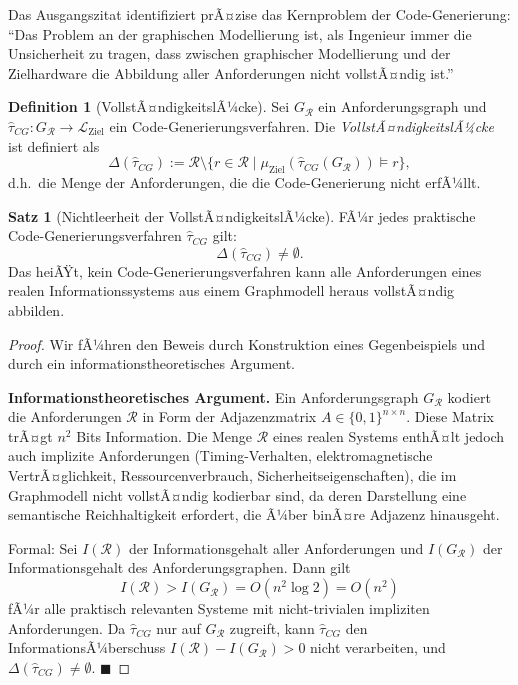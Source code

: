 ﻿\documentclass[a4paper,12pt]{article}
\theoremstyle{definition}
\newtheorem{definition}{Definition}
\newtheorem{satz}{Satz}
\begin{document}
Das Ausgangszitat identifiziert prÃ¤zise das Kernproblem der Code-Generierung:
\enquote{Das Problem an der graphischen Modellierung ist, als Ingenieur immer die Unsicherheit
zu tragen, dass zwischen graphischer Modellierung und der Zielhardware die Abbildung aller
Anforderungen nicht vollstÃ¤ndig ist.}

\begin{definition}[VollstÃ¤ndigkeitslÃ¼cke]
\label{def:vollstaendigkeit}
Sei $G_\mathcal{R}$ ein Anforderungsgraph und $\hat{\tau}_{CG}: G_\mathcal{R} \to \mathcal{L}_{\text{Ziel}}$
ein Code-Generierungsverfahren. Die \emph{VollstÃ¤ndigkeitslÃ¼cke} ist definiert als
\[
  \Delta(\hat{\tau}_{CG}) := \mathcal{R} \setminus \{r \in \mathcal{R} \mid
  \mu_{\text{Ziel}}(\hat{\tau}_{CG}(G_\mathcal{R})) \models r\},
\]
d.h.\ die Menge der Anforderungen, die die Code-Generierung nicht erfÃ¼llt.
\end{definition}

\begin{satz}[Nichtleerheit der VollstÃ¤ndigkeitslÃ¼cke]
\label{satz:luecke}
FÃ¼r jedes praktische Code-Generierungsverfahren $\hat{\tau}_{CG}$ gilt:
\[
  \Delta(\hat{\tau}_{CG}) \neq \emptyset.
\]
Das heiÃŸt, kein Code-Generierungsverfahren kann alle Anforderungen eines realen
Informationssystems aus einem Graphmodell heraus vollstÃ¤ndig abbilden.
\end{satz}

\begin{proof}
Wir fÃ¼hren den Beweis durch Konstruktion eines Gegenbeispiels und durch ein
informationstheoretisches Argument.

\textbf{Informationstheoretisches Argument.}
Ein Anforderungsgraph $G_\mathcal{R}$ kodiert die Anforderungen $\mathcal{R}$ in Form
der Adjazenzmatrix $A \in \{0,1\}^{n \times n}$. Diese Matrix trÃ¤gt $n^2$ Bits Information.
Die Menge $\mathcal{R}$ eines realen Systems enthÃ¤lt jedoch auch implizite Anforderungen
(Timing-Verhalten, elektromagnetische VertrÃ¤glichkeit, Ressourcenverbrauch, Sicherheitseigenschaften),
die im Graphmodell nicht vollstÃ¤ndig kodierbar sind, da deren Darstellung eine
semantische Reichhaltigkeit erfordert, die Ã¼ber binÃ¤re Adjazenz hinausgeht.

Formal: Sei $I(\mathcal{R})$ der Informationsgehalt aller Anforderungen und
$I(G_\mathcal{R})$ der Informationsgehalt des Anforderungsgraphen. Dann gilt
\[
  I(\mathcal{R}) > I(G_\mathcal{R}) = O(n^2 \log 2) = O(n^2)
\]
fÃ¼r alle praktisch relevanten Systeme mit nicht-trivialen impliziten Anforderungen.
Da $\hat{\tau}_{CG}$ nur auf $G_\mathcal{R}$ zugreift, kann $\hat{\tau}_{CG}$
den InformationsÃ¼berschuss $I(\mathcal{R}) - I(G_\mathcal{R}) > 0$ nicht verarbeiten,
und $\Delta(\hat{\tau}_{CG}) \neq \emptyset$. $\blacksquare$
\end{proof}
\end{document}
